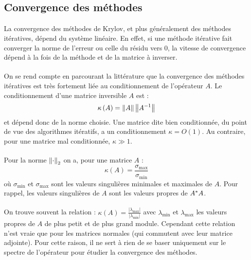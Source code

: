 	\subsection{Convergence des méthodes}

		\paragraph{}
		La convergence des méthodes de Krylov, et plus généralement des méthodes itératives, dépend du système linéaire.
		En effet, si une méthode itérative fait converger la norme de l'erreur ou celle du résidu vers 0, la vitesse de convergence dépend à la fois de la méthode et de la matrice à inverser.

		\paragraph{}
		On se rend compte en parcourant la littérature \cite{Nevanlinna1994} que la convergence des méthodes itératives est très fortement liée au conditionnement de l'opérateur $A$.
		Le conditionnement d'une matrice inversible $A$ est :
		\[\kappa\left(A\right) = \norm{A}\norm{A^{-1}}\]
		et dépend donc de la norme choisie.
		Une matrice dite bien conditionnée, du point de vue des algorithmes itératifs, a un conditionnement $\kappa = O\left(1\right)$.
		Au contraire, pour une matrice mal conditionnée, $\kappa\gg1$.

		\paragraph{}
		Pour la norme $\norm[2]{\cdot}$ on a, pour une matrice $A$ :
		\begin{equation}\label{eq:conditionnement}
			\kappa\left(A\right) = \frac{\sigma_{\max}}{\sigma_{\min}}
		\end{equation}
		où $\sigma_{\min}$ et $\sigma_{\max}$ sont les valeurs singulières minimales et maximales de $A$.
		Pour rappel, les valeurs singulières de $A$ sont les valeurs propres de ${A}^*A$.

		\paragraph{}
		On trouve souvent la relation : $\kappa\left(A\right) = \frac{\left|\lambda_{\max}\right|}{\left|\lambda_{\min}\right|}$ avec $\lambda_{\min}$ et $\lambda_{\max}$ les valeurs propres de $A$ de plus petit et de plus grand module.
		Cependant cette relation n'est vraie que pour les matrices normales (qui commutent avec leur matrice adjointe).
		Pour cette raison, il ne sert à rien de se baser uniquement sur le spectre de l'opérateur pour étudier la convergence des méthodes.

